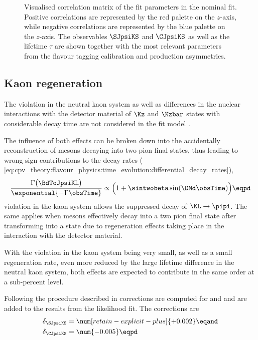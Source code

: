 %
\begin{figure}
\centering
  
  \caption{Visualised correlation matrix of the fit parameters in
    the nominal fit. Positive correlations are represented by the red palette on
    the $z$-axis, while negative correlations are represented by the blue
    palette on the $z$-axis. The \CP observables $\SJpsiKS$ and $\CJpsiKS$ as
    well as the \Bd lifetime $\tau$ are shown together with the most relevant
    parameters from the flavour tagging calibration and production asymmetries.}
  \label{fig:measurement_of_sin2beta:cpv_measurement:results:plots:correlation_matrix}
\end{figure}

\FloatBarrier
\clearpage
\subsection{Kaon regeneration}
\label{sec:measurement_of_sin2beta:cpv_measurement:kaon_regeneration}

The \CP violation in the neutral kaon system as well as differences in the
nuclear interactions with the detector material of $\Kz$ and $\Kzbar$ states
with considerable decay time are not considered in the fit model
\cite{set:kaonregeneration}.

The influence of both effects can be broken down into the accidentally
reconstruction of \KL mesons decaying into two pion final states, thus
leading to wrong-sign contributions to the decay rates (\cf
\cref{eq:cpv_theory:flavour_physics:time_evolution:differential_decay_rates}),
%
\begin{equation}
    \frac{\Gamma \bigl(\BdToJpsiKL\bigr)}{\exponential{-\Gamma \obsTime}} \propto \Bigl( 1 + \sintwobeta \sin(\DMd \obsTime) \Bigr) \eqpd
\end{equation}
%
\CP violation in the kaon system allows the suppressed decay of $\KL\to\pipi$.
The same applies when \KL mesons effectively decay into a two pion final state
after transforming into a \KS state due to regeneration effects taking place in
the interaction with the detector material. 

With the \CP violation in the kaon system being very small, as well as a small
regeneration rate, even more reduced by the large lifetime difference in the
neutral kaon system, both effects are expected to contribute in the same order
at a sub-percent level.

Following the procedure described in \cite{Aaij:2014gsa} corrections are
computed for \SJpsiKS and \CJpsiKS and are added to the results from the
likelihood fit. The corrections are
%
\begin{equation}
  \begin{split}
    \delta_{\SJpsiKS} &= \num[retain-explicit-plus]{+0.002} \eqand\\
    \delta_{\CJpsiKS} &= \num{-0.005} \eqpd
  \end{split}
\end{equation}
